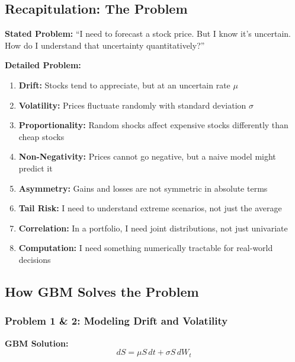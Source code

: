 \documentclass[12pt,a4paper]{article}
\begin{document}
\subsection{Recapitulation: The Problem}

\begin{tcolorbox}[colback=red!10, colframe=red!50, title=The Core Problem]

\textbf{Stated Problem:} ``I need to forecast a stock price. But I know it's uncertain. How do I understand that uncertainty quantitatively?''

\textbf{Detailed Problem:}
\begin{enumerate}
    \item \textbf{Drift:} Stocks tend to appreciate, but at an uncertain rate $\mu$
    \item \textbf{Volatility:} Prices fluctuate randomly with standard deviation $\sigma$
    \item \textbf{Proportionality:} Random shocks affect expensive stocks differently than cheap stocks
    \item \textbf{Non-Negativity:} Prices cannot go negative, but a naive model might predict it
    \item \textbf{Asymmetry:} Gains and losses are not symmetric in absolute terms
    \item \textbf{Tail Risk:} I need to understand extreme scenarios, not just the average
    \item \textbf{Correlation:} In a portfolio, I need joint distributions, not just univariate
    \item \textbf{Computation:} I need something numerically tractable for real-world decisions
\end{enumerate}

\end{tcolorbox}

\subsection{How GBM Solves the Problem}

\subsubsection{Problem 1 \& 2: Modeling Drift and Volatility}

\textbf{GBM Solution:}
\begin{equation}
dS = \mu S \, dt + \sigma S \, dW_t
\end{equation}
\end{document}
